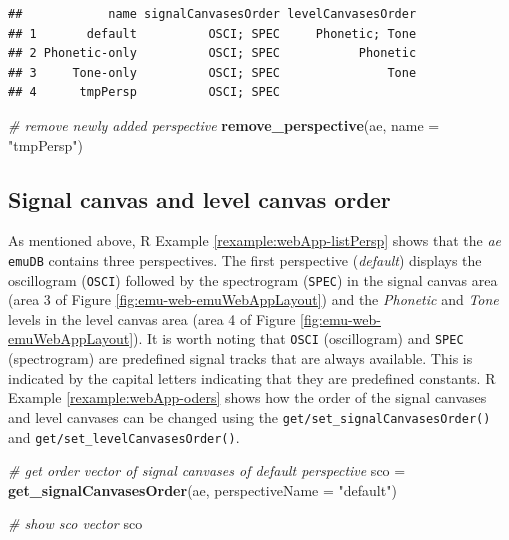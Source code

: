 \documentclass[]{book}
\newenvironment{Shaded}{\begin{snugshade}}{\end{snugshade}}
\newcommand{\CommentTok}[1]{\textcolor[rgb]{0.56,0.35,0.01}{\textit{#1}}}
\newcommand{\DataTypeTok}[1]{\textcolor[rgb]{0.13,0.29,0.53}{#1}}
\newcommand{\KeywordTok}[1]{\textcolor[rgb]{0.13,0.29,0.53}{\textbf{#1}}}
\newcommand{\NormalTok}[1]{#1}
\newcommand{\StringTok}[1]{\textcolor[rgb]{0.31,0.60,0.02}{#1}}
\theoremstyle{definition}
\theoremstyle{definition}
\theoremstyle{definition}
\theoremstyle{remark}
\begin{document}
\begin{verbatim}
##            name signalCanvasesOrder levelCanvasesOrder
## 1       default          OSCI; SPEC     Phonetic; Tone
## 2 Phonetic-only          OSCI; SPEC           Phonetic
## 3     Tone-only          OSCI; SPEC               Tone
## 4      tmpPersp          OSCI; SPEC
\end{verbatim}

\begin{Shaded}
\begin{Highlighting}[]
\CommentTok{# remove newly added perspective}
\KeywordTok{remove_perspective}\NormalTok{(ae,}
                   \DataTypeTok{name =} \StringTok{"tmpPersp"}\NormalTok{)}
\end{Highlighting}
\end{Shaded}

\hypertarget{signal-canvas-and-level-canvas-order}{%
\subsection{Signal canvas and level canvas
order}\label{signal-canvas-and-level-canvas-order}}

As mentioned above, R Example \ref{rexample:webApp-listPersp} shows that
the \emph{ae} \texttt{emuDB} contains three perspectives. The first
perspective (\emph{default}) displays the oscillogram (\texttt{OSCI})
followed by the spectrogram (\texttt{SPEC}) in the signal canvas area
(area 3 of Figure \ref{fig:emu-web-emuWebAppLayout}) and the
\emph{Phonetic} and \emph{Tone} levels in the level canvas area (area 4
of Figure \ref{fig:emu-web-emuWebAppLayout}). It is worth noting that
\texttt{OSCI} (oscillogram) and \texttt{SPEC} (spectrogram) are
predefined signal tracks that are always available. This is indicated by
the capital letters indicating that they are predefined constants. R
Example \ref{rexample:webApp-oders} shows how the order of the signal
canvases and level canvases can be changed using the
\texttt{get/set\_signalCanvasesOrder()} and
\texttt{get/set\_levelCanvasesOrder()}.

\begin{Shaded}
\begin{Highlighting}[]
\CommentTok{# get order vector of signal canvases of default perspective}
\NormalTok{sco =}\StringTok{ }\KeywordTok{get_signalCanvasesOrder}\NormalTok{(ae,}
                              \DataTypeTok{perspectiveName =} \StringTok{"default"}\NormalTok{)}

\CommentTok{# show sco vector}
\NormalTok{sco}
\end{Highlighting}
\end{Shaded}
\end{document}
